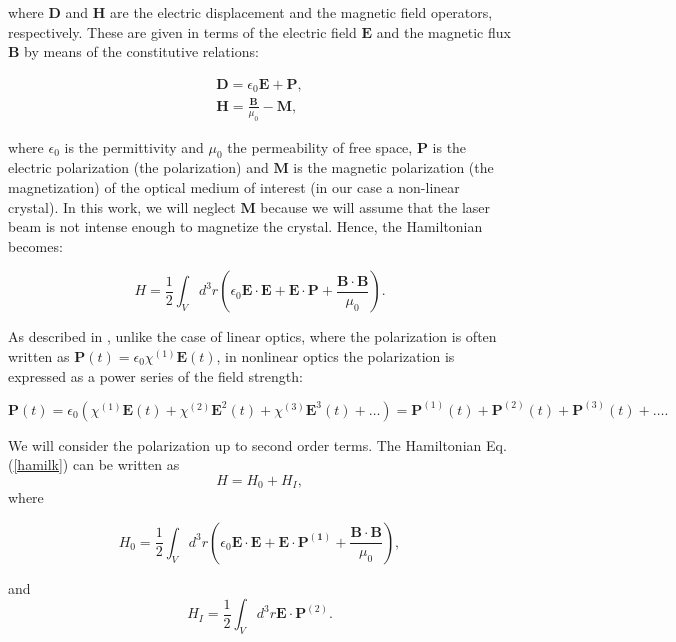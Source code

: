 \documentclass[12pt]{book}
\begin{document}
where $\textbf{D}$ and $\textbf{H}$ are the electric displacement and the magnetic field operators, respectively. These are given in terms of the electric field $\textbf{E}$ and the magnetic flux $\textbf{B}$ by means of the constitutive relations:


\begin{align}
\textbf{D}= \epsilon_{0} \textbf{E}+\textbf{P},\\
\textbf{H}=\frac{\textbf{B}}{\mu_{0}}-\textbf{M},
\end{align}

where $\epsilon_{0} $ is the permittivity and $\mu_{0}$ the permeability of free space, $\mathbf{P}$ is the electric polarization (the polarization) and $\mathbf{M}$ is the magnetic polarization (the magnetization) of the optical medium of interest (in our case a non-linear crystal). In this work, we will neglect $\textbf{M}$ because we will assume that the laser beam is not intense enough to magnetize the crystal. Hence, the Hamiltonian becomes:

\begin{equation}
H=\frac{1}{2}\int_{V} d^{3}r \left(\epsilon_{0}\mathbf{E \cdot E}+\mathbf{E \cdot P}+\frac{\mathbf{B \cdot B}}{\mu_{0}} \right).\label{hamikl}
\end{equation}


As described in \cite{boyd}, unlike the case of  linear optics, where the polarization is often written as $\mathbf{P}(t)=\epsilon_{0} \chi^{(1)}\mathbf{E}(t)$, in nonlinear optics the polarization is expressed as a power series of the field strength:

\begin{equation}
\mathbf{P}(t)=\epsilon_{0} \left( \chi^{(1)}\mathbf{E}(t)+\chi^{(2)}\mathbf{E}^{2}(t)+\chi^{(3)}\mathbf{E}^{3}(t)+ \dots \right)=\mathbf{P}^{(1)}(t)+\mathbf{P}^{(2)}(t)+\mathbf{P}^{(3)}(t)+ \dots .
\end{equation}

 We will consider the polarization up to second order terms. The Hamiltonian Eq. (\ref{hamilk}) can be written as $$H = H_0 + H_I,$$ where
 
\begin{equation}
 H_{0}=\frac{1}{2}\int_{V} d^{3}r \left(\epsilon_{0}\mathbf{E \cdot E}+\mathbf{E} \cdot \mathbf{P^{(1)}}+\frac{\mathbf{B \cdot B}}{\mu_{0}} \right),
\end{equation}

  and
  \begin{equation}
H_{I}=\frac{1}{2} \int_{V} d^{3}r \textbf{E} \cdot \textbf{P}^{(2)}. \label{Hi}
\end{equation}
  
\end{document}
